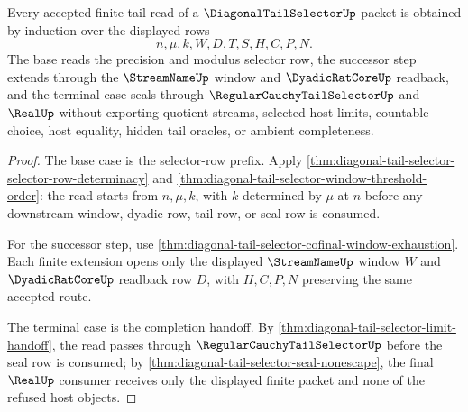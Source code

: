 \begin{theorem}
\label{thm:diagonal-tail-selector-finite-tail-induction}
Every accepted finite tail read of a $\DiagonalTailSelectorUp$ packet is obtained by induction over the displayed rows
$$
n,\mu,k,W,D,T,S,H,C,P,N.
$$
The base reads the precision and modulus selector row, the successor step extends through the $\StreamNameUp$ window and $\DyadicRatCoreUp$ readback, and the terminal case seals through $\RegularCauchyTailSelectorUp$ and $\RealUp$ without exporting quotient streams, selected host limits, countable choice, host equality, hidden tail oracles, or ambient completeness.
\end{theorem}
\begin{proof}
The base case is the selector-row prefix. Apply \autoref{thm:diagonal-tail-selector-selector-row-determinacy} and \autoref{thm:diagonal-tail-selector-window-threshold-order}: the read starts from $n,\mu,k$, with $k$ determined by $\mu$ at $n$ before any downstream window, dyadic row, tail row, or seal row is consumed.

For the successor step, use \autoref{thm:diagonal-tail-selector-cofinal-window-exhaustion}. Each finite extension opens only the displayed $\StreamNameUp$ window $W$ and $\DyadicRatCoreUp$ readback row $D$, with $H,C,P,N$ preserving the same accepted route.

The terminal case is the completion handoff. By \autoref{thm:diagonal-tail-selector-limit-handoff}, the read passes through $\RegularCauchyTailSelectorUp$ before the seal row is consumed; by \autoref{thm:diagonal-tail-selector-seal-nonescape}, the final $\RealUp$ consumer receives only the displayed finite packet and none of the refused host objects.
\end{proof}




